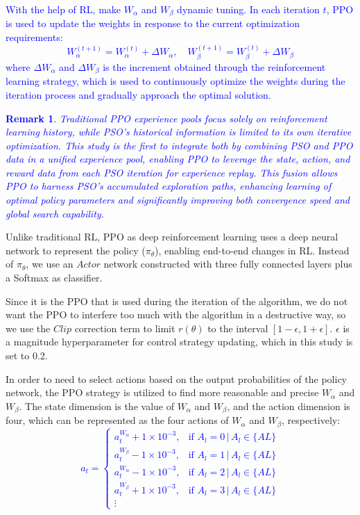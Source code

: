 \documentclass[review]{elsarticle}
\newtheorem{remark}{Remark}
\begin{document}
\textcolor{blue}{With the help of RL, make $W_{\alpha}$ and $W_{\beta}$ dynamic tuning. In each iteration $t$, PPO is used to update the weights in response to the current optimization requirements:
	\begin{equation}
		W_{\alpha}^{(t+1)} = W_{\alpha}^{(t)} + \Delta W_{\alpha}, \quad W_{\beta}^{(t+1)} = W_{\beta}^{(t)} + \Delta W_{\beta}
	\end{equation}
	where $\Delta W_{\alpha}$ and $\Delta W_{\beta}$ is the increment obtained through the reinforcement learning strategy, which is used to continuously optimize the weights during the iteration process and gradually approach the optimal solution.}
\textcolor{blue}{\begin{remark}
		\emph{Traditional PPO experience pools focus solely on reinforcement learning history, while PSO's historical information is limited to its own iterative optimization. This study is the first to integrate both by combining PSO and PPO data in a unified experience pool, enabling PPO to leverage the state, action, and reward data from each PSO iteration for experience replay. This fusion allows PPO to harness PSO's accumulated exploration paths, enhancing learning of optimal policy parameters and significantly improving both convergence speed and global search capability.}
\end{remark}}

Unlike traditional RL, PPO as deep reinforcement learning uses a deep neural network to represent the policy ($\pi_{\theta}$), enabling end-to-end changes in RL. Instead of $\pi_{\theta}$, we use an $Actor$ network constructed with three fully connected layers plus a Softmax as classifier.

Since it is the PPO that is used during the iteration of the algorithm, we do not want the PPO to interfere too much with the algorithm in a destructive way, so we use the $Clip$ correction term to limit $r(\theta)$ to the interval $[1-\epsilon,1+\epsilon]$. $\epsilon$ is a magnitude hyperparameter for control strategy updating, which in this study is set to 0.2.

In order to need to select actions based on the output probabilities of the policy network, the PPO strategy is utilized to find more reasonable and precise $W_{\alpha}$ and $W_{\beta}$. The state dimension is the value of $W_{\alpha}$ and $W_{\beta}$, and the action dimension is four, which can be represented as the four actions of $W_{\alpha}$ and $W_{\beta}$, respectively:
\textcolor{blue}{
\begin{equation}
		\label{actions}
		{a}_{t}=
		\begin{cases}
			a_t^{W_{\alpha}} + 1 \times 10^{-3}, & \text{if } A_l = 0 \,|\, A_l \in \{AL\}\\
			{a}_{t}^{W_{\beta}}-1\times10^{-3},& \text{if } A_l = 1 \,|\, A_l \in \{AL\}\\
			{a}_{t}^{W_{\alpha}}-1\times10^{-3},& \text{if } A_l = 2 \,|\, A_l \in \{AL\}\\
			{a}_{t}^{W_{\beta}}+1\times10^{-3},& \text{if } A_l = 3 \,|\, A_l \in \{AL\}\\
			\vdots & 	
		\end{cases}
\end{equation}}
\end{document}
